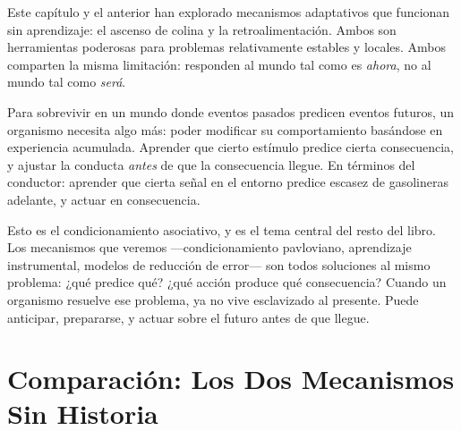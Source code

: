 \documentclass[
  letterpaper,
  DIV=11,
  numbers=noendperiod]{scrreprt}
\begin{document}
\begin{tcolorbox}[enhanced jigsaw, toprule=.15mm, arc=.35mm, colback=white, opacityback=0, colframe=quarto-callout-note-color-frame, breakable, rightrule=.15mm, left=2mm, leftrule=.75mm, bottomrule=.15mm]
Este capítulo y el anterior han explorado mecanismos adaptativos que
funcionan sin aprendizaje: el ascenso de colina y la retroalimentación.
Ambos son herramientas poderosas para problemas relativamente estables y
locales. Ambos comparten la misma limitación: responden al mundo tal
como es \emph{ahora}, no al mundo tal como \emph{será}.

Para sobrevivir en un mundo donde eventos pasados predicen eventos
futuros, un organismo necesita algo más: poder modificar su
comportamiento basándose en experiencia acumulada. Aprender que cierto
estímulo predice cierta consecuencia, y ajustar la conducta \emph{antes}
de que la consecuencia llegue. En términos del conductor: aprender que
cierta señal en el entorno predice escasez de gasolineras adelante, y
actuar en consecuencia.

Esto es el condicionamiento asociativo, y es el tema central del resto
del libro. Los mecanismos que veremos ---condicionamiento pavloviano,
aprendizaje instrumental, modelos de reducción de error--- son todos
soluciones al mismo problema: ¿qué predice qué? ¿qué acción produce qué
consecuencia? Cuando un organismo resuelve ese problema, ya no vive
esclavizado al presente. Puede anticipar, prepararse, y actuar sobre el
futuro antes de que llegue.

\section{Comparación: Los Dos Mecanismos Sin
Historia}\label{comparaciuxf3n-los-dos-mecanismos-sin-historia}


\end{tcolorbox}
\end{document}
